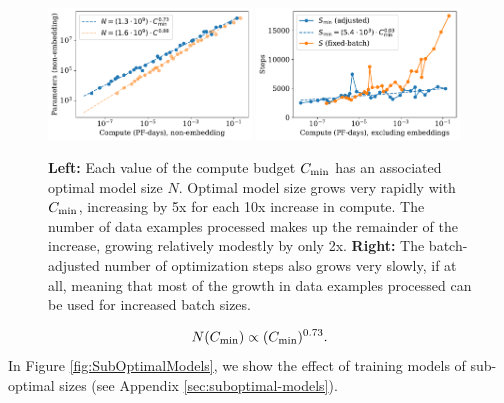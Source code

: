 \documentclass[english]{article}
\newcommand{\be}{\begin{equation}}
\newcommand{\ee}{\end{equation}}
\begin{document}
\begin{figure}
\noindent \centering{}
\includegraphics[width=0.48\textwidth]{ComputevsOptimalModelSize}\hfill
\includegraphics[width=0.48\textwidth]{ComputeEfficientSteps}
\caption[Optimal model size and serial number of steps versus compute budget]{
\textbf{Left:} Each value of the compute budget $C_{\rm min}$ has an associated optimal model size $N$.  Optimal model size grows very rapidly with $C_{\rm min}$, increasing by 5x for each 10x increase in compute.  The number of data examples processed makes up the remainder of the increase, growing relatively modestly by only 2x.
\textbf{Right:} The batch-adjusted number of optimization steps also grows very slowly, if at all, meaning that most of the growth in data examples processed can be used for increased batch sizes.
\label{fig:ComputevsPerformance}}
\end{figure}

\be
N(C_{\rm min}) \propto (C_{\rm min})^{0.73}.
\ee
In Figure \ref{fig:SubOptimalModels}, we show the effect of training models of sub-optimal sizes (see Appendix \ref{sec:suboptimal-models}).
\end{document}
